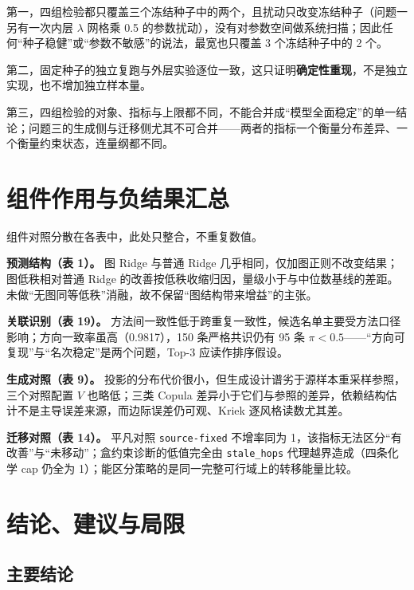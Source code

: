 \documentclass[11pt,a4paper]{article}
\begin{document}
第一，四组检验都只覆盖三个冻结种子中的两个，且扰动只改变冻结种子（问题一另有一次内层
\(\lambda\) 网格乘 0.5
的参数扰动），没有对参数空间做系统扫描；因此任何``种子稳健''或``参数不敏感''的说法，最宽也只覆盖
3 个冻结种子中的 2 个。

第二，固定种子的独立复跑与外层实验逐位一致，这只证明\textbf{确定性重现}，不是独立实现，也不增加独立样本量。

第三，四组检验的对象、指标与上限都不同，不能合并成``模型全面稳定''的单一结论；问题三的生成侧与迁移侧尤其不可合并------两者的指标一个衡量分布差异、一个衡量约束状态，连量纲都不同。

\section{组件作用与负结果汇总}\label{ux7ec4ux4ef6ux4f5cux7528ux4e0eux8d1fux7ed3ux679cux6c47ux603b}

组件对照分散在各表中，此处只整合，不重复数值。

\textbf{预测结构（表 1）。} 图 Ridge 与普通 Ridge
几乎相同，仅加图正则不改变结果；图低秩相对普通 Ridge
的改善按低秩收缩归因，量级小于与中位数基线的差距。未做``无图同等低秩''消融，故不保留``图结构带来增益''的主张。

\textbf{关联识别（表 19）。}
方法间一致性低于跨重复一致性，候选名单主要受方法口径影响；方向一致率虽高（0.9817），150
条严格共识仍有 95 条
\(\pi<0.5\)------``方向可复现''与``名次稳定''是两个问题，Top-3
应读作排序假设。

\textbf{生成对照（表 9）。}
投影的分布代价很小，但生成设计谱劣于源样本重采样参照，三个对照配置 \(V\)
也略低；三类 Copula
差异小于它们与参照的差异，依赖结构估计不是主导误差来源，而边际误差仍可观、Kriek
逐风格读数尤其差。

\textbf{迁移对照（表 14）。} 平凡对照 \texttt{source-fixed} 不增率同为
1，该指标无法区分``有改善''与``未移动''；盒约束诊断的低值完全由
\texttt{stale\_hops} 代理越界造成（四条化学 cap 仍全为
1）；能区分策略的是同一完整可行域上的转移能量比较。

\section{结论、建议与局限}\label{ux7ed3ux8bbaux5efaux8baeux4e0eux5c40ux9650}

\subsection{主要结论}\label{ux4e3bux8981ux7ed3ux8bba}
\end{document}
